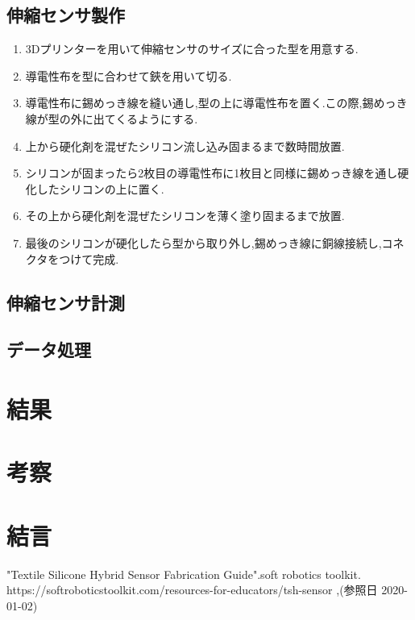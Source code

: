 \subsection{伸縮センサ製作}
\begin{enumerate}
    \item 3Dプリンターを用いて伸縮センサのサイズに合った型を用意する.
    \item 導電性布を型に合わせて鋏を用いて切る.
    \item 導電性布に錫めっき線を縫い通し,型の上に導電性布を置く.この際,錫めっき線が型の外に出てくるようにする.
    \item 上から硬化剤を混ぜたシリコン流し込み固まるまで数時間放置.
    \item シリコンが固まったら2枚目の導電性布に1枚目と同様に錫めっき線を通し硬化したシリコンの上に置く.
    \item その上から硬化剤を混ぜたシリコンを薄く塗り固まるまで放置.
    \item 最後のシリコンが硬化したら型から取り外し,錫めっき線に銅線接続し,コネクタをつけて完成.
\end{enumerate}
\subsection{伸縮センサ計測}

\subsection{データ処理}

\section{結果}

\section{考察}

\section{結言}

\small
\begin{thebibliography}{99}
 "Textile Silicone Hybrid Sensor Fabrication Guide".soft robotics toolkit. \newline https://softroboticstoolkit.com/resources-for-educators/tsh-sensor ,(参照日 2020-01-02)
\end{thebibliography}
\normalsize
